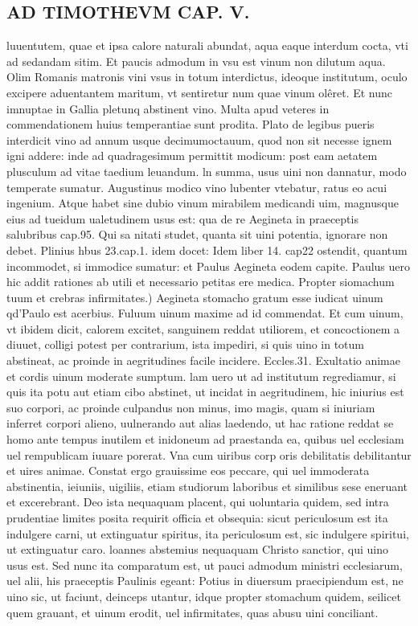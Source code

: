 \documentclass{article}
\begin{document}
\begin{pages}
\section*{AD TIMOTHEVM CAP. V. }
\marginpar{[ p.118 ]}\pstart luuentutem, quae et ipsa calore naturali abundat, aqua eaque interdum cocta, vti ad sedandam sitim. Et paucis admodum in vsu est vinum non dilutum aqua. Olim Romanis matronis vini vsus in totum interdictus, ideoque institutum, oculo excipere aduentantem maritum, vt sentiretur num quae vinum olêret. Et nunc imnuptae in Gallia pletunq abstinent vino. Multa apud veteres in commendationem huius temperantiae sunt prodita. Plato de legibus pueris interdicit vino ad annum usque decimumoctauum, quod non sit necesse ignem igni addere: inde ad quadragesimum permittit modicum: post eam aetatem plusculum ad vitae taedium leuandum. ln summa, usus uini non dannatur, modo temperate sumatur. Augustinus modico vino lubenter vtebatur, ratus eo acui ingenium. Atque habet sine dubio vinum mirabilem medicandi uim, magnusque eius ad tueidum ualetudinem usus est: qua de re Aegineta in praeceptis salubribus cap.95. Qui sa nitati studet, quanta sit uini potentia, ignorare non debet. Plinius hbus 23.cap.1. idem docet: Idem liber 14. cap22 ostendit, quantum incommodet, si immodice sumatur: et Paulus Aegineta eodem capite. Paulus uero hic addit rationes ab utili et necessario petitas ere medica. Propter siomachum tuum et crebras infirmitates.) Aegineta stomacho gratum esse iudicat uinum qd'Paulo est acerbius. Fuluum uinum maxime ad id commendat. Et cum uinum, vt ibidem dicit, calorem excitet, sanguinem reddat utiliorem, et concoctionem a diuuet, colligi potest per contrarium, ista impediri, si quis uino in totum abstineat, ac proinde in aegritudines facile incidere. Eccles.31. Exultatio animae et cordis uinum moderate sumptum. lam uero ut ad institutum regrediamur, si quis ita potu aut etiam cibo abstinet, ut incidat in aegritudinem, hic iniurius est suo corpori, ac proinde culpandus non minus, imo magis, quam si iniuriam inferret corpori alieno, uulnerando aut alias laedendo, ut hac ratione reddat se homo ante tempus inutilem et inidoneum ad praestanda ea, quibus uel ecclesiam uel rempublicam iuuare porerat. Vna cum uiribus corp oris debilitatis debilitantur et uires animae. Constat ergo grauissime eos peccare, qui uel immoderata abstinentia, ieiuniis, uigiliis, etiam studiorum laboribus et similibus sese eneruant et excerebrant. Deo ista nequaquam placent, qui uoluntaria quidem, sed intra prudentiae limites posita requirit officia et obsequia: sicut periculosum est ita indulgere carni, ut extinguatur spiritus, ita periculosum est, sic indulgere spiritui, ut extinguatur caro. loannes abstemius nequaquam Christo sanctior, qui uino usus est. Sed nunc ita comparatum est, ut pauci admodum ministri ecclesiarum, uel alii, his praeceptis Paulinis egeant: Potius in diuersum praecipiendum est, ne uino sic, ut faciunt, deinceps utantur, idque propter stomachum quidem, seilicet quem grauant, et uinum erodit, uel infirmitates, quas abusu uini conciliant.  \pend
{}
{}

\end{pages}
\end{document}
